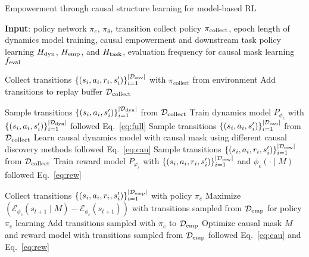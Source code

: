 \begin{algorithm}[h]
    \caption{Empowerment through causal structure learning for model-based RL}
    \label{alg:algorithm1}
    \textbf{Input}: policy network $\pi_{e}$, $\pi_{\theta}$, transition collect policy $\pi_{\rm{collect}}$, epoch length of dynamics model training, causal empowerment and downstream task policy learning $H_{\rm{dyn}}$, $H_{\rm{emp}}$, and $H_{\rm{task}}$, evaluation frequency for causal mask learning $f_{\rm{eval}}$
    \begin{algorithmic}[]
    \begin{tcolorbox}[colback=green!10!white,colframe=green!50!black,title=Step 1: Model Learning]
     \STATE Collect transitions $\{(s_{i},a_{i}, r_{i}, s'_{i})\}_{i=1}^{|\mathcal{D}_{\rm{env}}|}$ with $\pi_{\mathrm{collect}}$ from environment
     \STATE Add transitions to replay buffer $\mathcal{D}_{\rm{collect}}$
     \ENDFOR
     
      \STATE  Sample transitions $\{(s_{i},a_{i}, s'_{i})\}_{i=1}^{|\mathcal{D}_{\rm{dyn}}|}$ from $\mathcal{D}_{\rm{collect}}$
      \STATE Train dynamics model $P_{\phi_c}$ with $\{(s_{i},a_{i}, s'_{i})\}_{i=1}^{|\mathcal{D}_{\rm{dyn}}|}$ followed Eq.~\ref{eq:full}
      \STATE Sample transitions $\{(s_{i},a_{i}, s'_{i})\}_{i=1}^{|\mathcal{D}_{\rm{cau}}|}$ from $\mathcal{D}_{\rm{collect}}$
      \STATE Learn causal dynamics model with causal mask using different causal discovery methods followed Eq.~\ref{eq:cau}
      \ENDIF
      \STATE Sample transitions $\{(s_{i},a_{i}, r_i, s'_{i})\}_{i=1}^{|\mathcal{D}_{\rm{rew}}|}$ from $\mathcal{D}_{\rm{collect}}$
      \STATE Train reward model $P_{\varphi_{r}}$ with  $\{(s_{i},a_{i}, r_i, s'_{i})\}_{i=1}^{|\mathcal{D}_{\rm{rew}}|}$ and $\phi_c(\cdot \mid M)$ followed Eq.~\ref{eq:rew}
      \ENDFOR
     \end{tcolorbox}

      \begin{tcolorbox}[colback=orange!10!white,colframe=orange!60!black,title=Step 2: Model Optimization]
       \STATE Collect transitions $\{(s_{i},a_{i}, r_i, s'_{i})\}_{i=1}^{|\mathcal{D}_{\rm{emp}}|}$ with policy $\pi_{e}$ 
    \STATE Maximize $ \left(\mathcal{E}_{\phi_c}(s_{t+1}\mid M)-\mathcal{E}_{\phi_c} (s_{t+1}) \right) $ with transitions sampled from $\mathcal{D}_{\rm{emp}}$ for policy $\pi_{e}$ learning 
    \STATE Add transitions sampled with $\pi_{e}$ to $\mathcal{D}_{\rm{emp}}$
      \STATE Optimize causal mask $M$ and reward model with transitions sampled from $\mathcal{D}_{\rm{emp}}$ followed Eq.~\ref{eq:cau} and Eq.~\ref{eq:rew}
      \ENDIF
    \ENDFOR
    \end{tcolorbox}


\end{algorithmic}
\end{algorithm}

